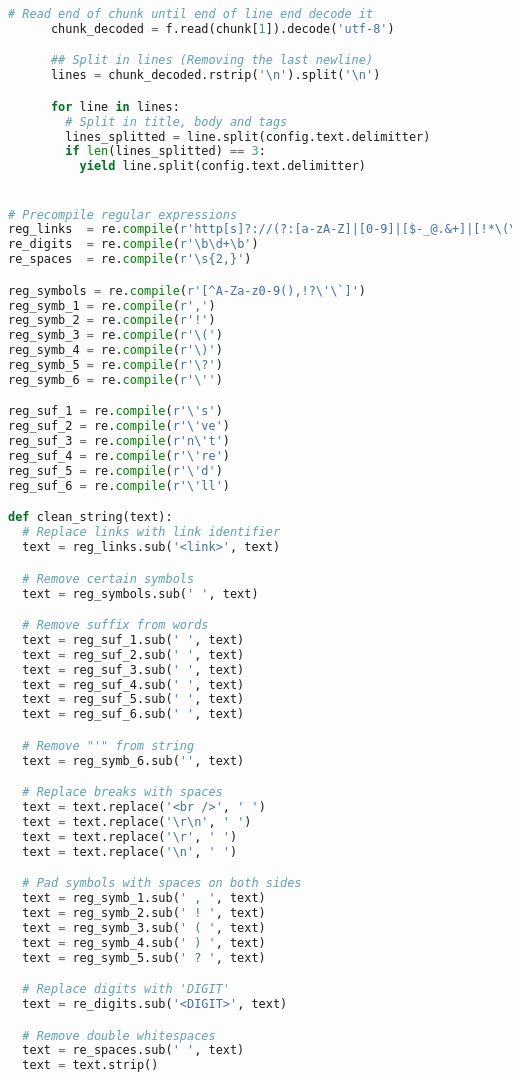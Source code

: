 \begin{lstlisting}[language=python]
      # Read end of chunk until end of line end decode it
      chunk_decoded = f.read(chunk[1]).decode('utf-8')

      ## Split in lines (Removing the last newline)
      lines = chunk_decoded.rstrip('\n').split('\n')

      for line in lines:
        # Split in title, body and tags
        lines_splitted = line.split(config.text.delimitter)
        if len(lines_splitted) == 3:
          yield line.split(config.text.delimitter)


# Precompile regular expressions
reg_links  = re.compile(r'http[s]?://(?:[a-zA-Z]|[0-9]|[$-_@.&+]|[!*\(\),]|(?:%[0-9a-fA-F][0-9a-fA-F]))+')
re_digits  = re.compile(r'\b\d+\b')
re_spaces  = re.compile(r'\s{2,}')

reg_symbols = re.compile(r'[^A-Za-z0-9(),!?\'\`]')
reg_symb_1 = re.compile(r',')
reg_symb_2 = re.compile(r'!')
reg_symb_3 = re.compile(r'\(')
reg_symb_4 = re.compile(r'\)')
reg_symb_5 = re.compile(r'\?')
reg_symb_6 = re.compile(r'\'')

reg_suf_1 = re.compile(r'\'s')
reg_suf_2 = re.compile(r'\'ve')
reg_suf_3 = re.compile(r'n\'t')
reg_suf_4 = re.compile(r'\'re')
reg_suf_5 = re.compile(r'\'d')
reg_suf_6 = re.compile(r'\'ll')

def clean_string(text):
  # Replace links with link identifier
  text = reg_links.sub('<link>', text)

  # Remove certain symbols
  text = reg_symbols.sub(' ', text)

  # Remove suffix from words
  text = reg_suf_1.sub(' ', text)
  text = reg_suf_2.sub(' ', text)
  text = reg_suf_3.sub(' ', text)
  text = reg_suf_4.sub(' ', text)
  text = reg_suf_5.sub(' ', text)
  text = reg_suf_6.sub(' ', text)

  # Remove "'" from string
  text = reg_symb_6.sub('', text)

  # Replace breaks with spaces
  text = text.replace('<br />', ' ')
  text = text.replace('\r\n', ' ')
  text = text.replace('\r', ' ')
  text = text.replace('\n', ' ')

  # Pad symbols with spaces on both sides
  text = reg_symb_1.sub(' , ', text)
  text = reg_symb_2.sub(' ! ', text)
  text = reg_symb_3.sub(' ( ', text)
  text = reg_symb_4.sub(' ) ', text)
  text = reg_symb_5.sub(' ? ', text)

  # Replace digits with 'DIGIT'
  text = re_digits.sub('<DIGIT>', text)

  # Remove double whitespaces
  text = re_spaces.sub(' ', text)
  text = text.strip()


\end{lstlisting}
